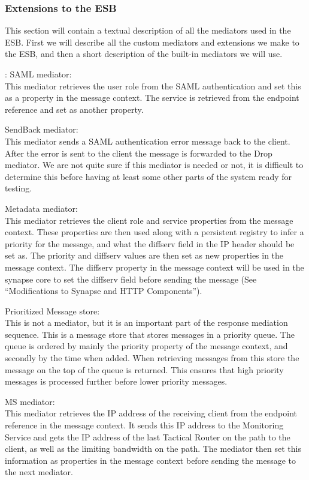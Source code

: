     \subsubsection{Extensions to the ESB}\label{Extensions to the ESB} 
    This section will contain a textual description of all the mediators used in the ESB. First we will describe all the custom mediators and extensions we make to the ESB, and then a short description of the built-in mediators we will use.

    \label{Custom mediators}:
    SAML mediator:\\
    This mediator retrieves the user role from the SAML authentication and set this as a property in the message context. The service is retrieved from the endpoint reference and set as another property.

    SendBack mediator:\\
    This mediator sends a SAML authentication error message back to the client. After the error is sent to the client the message is forwarded to the Drop mediator. We are not quite sure if this mediator is needed or not, it is difficult to determine this before having at least some other parts of the system ready for testing.

    Metadata mediator:\\
    This mediator retrieves the client role and service properties from the message context. These properties are then used along with a persistent registry to infer a priority for the message, and what the diffserv field in the IP header should be set as. The priority and diffserv values are then set as new properties in the message context.
    The diffserv property in the message context will be used in the synapse core to set the diffserv field before sending the message (See “Modifications to Synapse and HTTP Components”).

    Prioritized Message store:\\
    This is not a mediator, but it is an important part of the response mediation sequence. This is a message store that stores messages in a priority queue. The queue is ordered by mainly the priority property of the message context, and secondly by the time when added. When retrieving messages from this store the message on the top of the queue is returned. This ensures that high priority messages is processed further before lower priority messages.

    MS mediator:\\
    This mediator retrieves the IP address of the receiving client from the endpoint reference in the message context. It sends this IP address to the Monitoring Service and gets the IP address of the last Tactical Router on the path to the client, as well as the limiting bandwidth on the path. The mediator then set this information as properties in the message context before sending the message to the next mediator.

